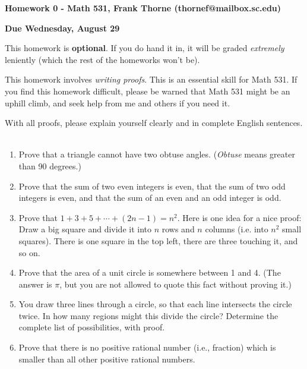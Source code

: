 \documentclass[12pt]{article}
\begin{document}
\setlength{\topmargin}{-2mm}





\begin{center}{\bf Homework 0 - Math 531, Frank Thorne (thornef@mailbox.sc.edu)}
\end{center}
\begin{center}
{\bf Due Wednesday, August 29}
\end{center}

This homework is {\bf optional}. If you do hand it in, it will be graded {\itshape extremely}
leniently (which the rest of the homeworks won't be).

This homework involves {\itshape writing proofs}. This is an essential skill for Math 531.
If you find this homework difficult, please be warned that Math 531 might be an uphill climb,
and seek help from me and others if you need it.

With all proofs, please explain yourself clearly and in complete English sentences.
\\
\\
\begin{enumerate}[(1)]
\item 
Prove that a triangle cannot have two obtuse angles. ({\itshape Obtuse} means greater than 90 degrees.)

\item
Prove that the sum of two even integers is even, that the sum of two odd integers is even, and
that the sum of an even and an odd integer is odd.

\item
Prove that $1 + 3 + 5 + \cdots + (2n - 1) = n^2$. Here is one idea for a nice proof: Draw a big
square and divide it into $n$ rows and $n$ columns (i.e. into $n^2$ small squares). There is one
square in the top left, there are three touching it, and so on.

\item
Prove that the area of a unit circle is somewhere between 1 and 4. (The answer is $\pi$, but you are
not allowed to quote this fact without proving it.)

\item 
You draw three lines through a circle, so that each line intersects the circle twice. In how many regions
might this divide the circle? Determine the complete list of possibilities, with proof.

\item
Prove that there is no positive rational number (i.e., fraction) which is smaller than all other positive rational
numbers.

\end{enumerate}
\end{document}
